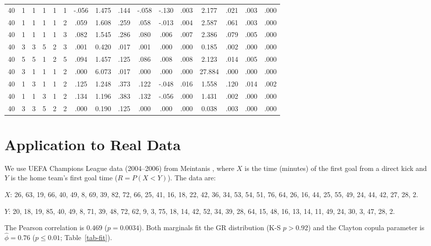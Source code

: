 \documentclass[twoside]{article}
\begin{document}
\begin{table}[H]
\begin{tabular}{c c c c c c | c c c c c | c c c c c}
		40 & 1 & 1 & 1 & 1 & 1 & -.056 & 1.475 & .144 & -.058 & -.130 & .003 & 2.177 & .021 & .003 & .000 \\
		40 & 1 & 1 & 1 & 1 & 2 & .059 & 1.608 & .259 & .058 & -.013 & .004 & 2.587 & .061 & .003 & .000 \\
		40 & 1 & 1 & 1 & 1 & 3 & .082 & 1.545 & .286 & .080 & .006 & .007 & 2.386 & .079 & .005 & .000 \\
		40 & 3 & 3 & 5 & 2 & 3 & .001 & 0.420 & .017 & .001 & .000 & .000 & 0.185 & .002 & .000 & .000 \\
		40 & 5 & 5 & 1 & 2 & 5 & .094 & 1.457 & .125 & .086 & .008 & .008 & 2.123 & .014 & .005 & .000 \\
		40 & 3 & 1 & 1 & 1 & 2 & .000 & 6.073 & .017 & .000 & .000 & .000 & 27.884 & .000 & .000 & .000 \\
		40 & 1 & 3 & 1 & 1 & 2 & .125 & 1.248 & .373 & .122 & -.048 & .016 & 1.558 & .120 & .014 & .002 \\
		40 & 1 & 1 & 3 & 1 & 2 & .134 & 1.196 & .383 & .132 & -.056 & .000 & 1.431 & .002 & .000 & .000 \\
		40 & 3 & 3 & 5 & 2 & 2 & .000 & 0.190 & .125 & .000 & .000 & .000 & 0.038 & .003 & .000 & .000 \\
		
		\hline
	\end{tabular}
\end{table}
\section{Application to Real Data}

We use UEFA Champions League data (2004--2006) from Meintanis \cite{Meintanis2007}, where $X$ is the time (minutes) of the first goal from a direct kick and $Y$ is the home team's first goal time ($R = P(X < Y)$). The data are:

\noindent
$X$: 26, 63, 19, 66, 40, 49, 8, 69, 39, 82, 72, 66, 25, 41, 16, 18, 22, 42, 36, 34, 53, 54, 51, 76, 64, 26, 16, 44, 25, 55, 49, 24, 44, 42, 27, 28, 2.

\noindent
$Y$: 20, 18, 19, 85, 40, 49, 8, 71, 39, 48, 72, 62, 9, 3, 75, 18, 14, 42, 52, 34, 39, 28, 64, 15, 48, 16, 13, 14, 11, 49, 24, 30, 3, 47, 28, 2.

The Pearson correlation is $0.469$ ($p = 0.0034$). Both marginals fit the GR distribution (K-S $p > 0.92$) and the Clayton copula parameter is $\widehat{\phi} = 0.76$ ($p \leq 0.01$; Table~\ref{tab-fit}).
\end{document}

